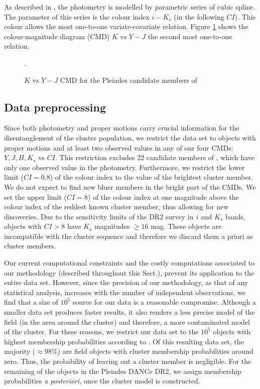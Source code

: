 As described in \citet{Olivares2017}, the photometry is modelled by parametric series of cubic spline. The parameter of this series is the colour index $i-K_s$ (in the following $CI$). This colour allows the most one-to-one variate-covariate relation. Figure \ref{fig:otherCI} shows the colour-magnitude diagram (CMD) $K$ vs $Y-J$ the second most one-to-one relation.


\begin{figure}[htbp]
\begin{center}
\caption{$K$ vs $Y-J$ CMD for the Pleiades candidate members of \citet{Bouy2015}}.
\label{fig:otherCI}
\end{center}
\end{figure}

\subsection{Data preprocessing}
 Since both photometry and proper motions carry crucial information for the disentanglement of the cluster population, we restrict the data set to objects with proper motions and at least two observed values in any of our four CMDs: $Y,J,H,K_s$ vs $CI$. This restriction excludes 22 candidate members of \citet{Bouy2015}, which have only one observed value in the photometry. Furthermore, we restrict the lower limit ($CI =0.8$) of the colour index to the value of the brightest cluster member. We do not expect to find new bluer members in the bright part of the CMDs. We set the upper limit ($CI=8$) of the colour index at one magnitude above the colour index of the reddest known cluster member, thus allowing for new discoveries. Due to the sensitivity limits of the DR2 survey in $i$ and $K_s$ bands, objects with $CI>8$ have $K_s$ magnitudes $\geq 16$ mag. These objects are incompatible with the cluster sequence and therefore we discard them a priori as cluster members.

Our current computational constraints and the costly computations associated to our methodology (described throughout this Sect.), prevent its application to the entire data set. However, since the precision of our methodology, as that of any statistical analysis, increases with the number of independent observations, we find that a size of $10^5$ source for our data is a reasonable compromise. Although a smaller data set produces faster results, it also renders a less precise model of the field (in the area around the cluster) and therefore, a more contaminated model of the cluster. For these reasons, we restrict our data set to the $10^5$ objects with highest membership probabilities according to \citet{Bouy2015}. Of this resulting data set, the majority ($\approx$98\%) are field objects with cluster membership probabilities around zero. Thus, the probability of leaving out a cluster member is negligible. For the remaining of the objects in the Pleiades DANCe DR2, we assign membership probabilities \emph{a posteriori}, once the cluster model is constructed.



